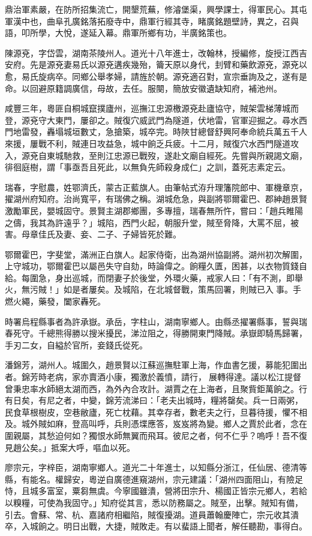 \begin{pinyinscope}
鼎治軍素嚴，在防所招集流亡，開墾荒蕪，修濬堡渠，興學課士，得軍民心。其屯軍漢中也，曲阜孔廣銘落拓廢寺中，鼎軍行經其寺，睹廣銘題壁詩，異之，召與語，叩所學，大悅，遂延入幕。鼎軍所鄉有功，半廣銘策也。

陳源兗，字岱雲，湖南茶陵州人。道光十八年進士，改翰林，授編修，旋授江西吉安府。先是源兗妻易氏以源兗遘疾幾殆，籥天原以身代，刲臂和藥飲源兗，源兗以愈，易氏旋病卒。同鄉公舉孝婦，請旌於朝。源兗適召對，宣宗垂詢及之，遂有是命。以回避原籍調廣信，母故，去任。服闋，簡放安徽遺缺知府，補池州。

咸豐三年，粵匪自桐城竄撲廬州，巡撫江忠源檄源兗赴廬協守，賊架雲梯薄城而登，源兗守大東門，屢卻之。賊復穴威武門為隧道，伏地雷，官軍迎掘之。尋水西門地雷發，轟塌城垣數丈，急搶築，城卒完。時陜甘總督舒興阿奉命統兵萬五千人來援，屢戰不利，賊連日攻益急，城中餉乏兵疲。十二月，賊復穴水西門隧道攻入，源兗自東城馳救，至則江忠源已戰歿，遂赴文廟自經死。先嘗與所親謁文廟，徘徊庭樹，謂「事亟吾且死此，以無負先師殺身成仁」之訓，蓋死志素定云。

瑞春，字慰農，姓鄂濟氏，蒙古正藍旗人。由筆帖式洊升理籓院郎中、軍機章京，擢湖州府知府。治尚寬平，有瑞佛之稱。湖城危急，與副將鄂爾霍巴、郡紳趙景賢激勵軍民，嬰城固守。景賢主湖郡鄉團，多專擅，瑞春無所忤，嘗曰：「趙兵睢陽之儔，我其為許遠乎？」城陷，西門火起，朝服升堂，賊至脅降，大罵不屈，被害。母章佳氏及妻、妾、二子、子婦皆死於難。

鄂爾霍巴，字斐堂，滿洲正白旗人。起家侍衛，出為湖州協副將。湖州初次解圍，上守城功，鄂爾霍巴以屬邑失守自劾，時論偉之。餉糧久匱，困甚，以衣物質錢自給。每圍急，身出巡城，而閉妻子於後堂，外環火藥，戒家人曰：「有不測，即舉火，無污賊！」如是者屢矣。及城陷，在北城督戰，策馬回署，則賊已入事。手燃火繩，藥發，闔家轟死。

時署烏程縣事者為許承嶽。承岳，字柱山，湖南寧鄉人。由縣丞擢署縣事，誓與瑞春死守。千總熊得勝以搜米擾民，涕泣阻之，得勝開東門降賊。承嶽即騎馬歸署，手刃二女，自縊於官所，妾錢氏從死。

潘錦芳，湖州人。城圍久，趙景賢以江蘇巡撫駐軍上海，作血書乞援，募能犯圍出者。錦芳時老病，家亦賣酒小康，獨激於義憤，請行，展轉得達。議以松江提督曾秉忠率水師絕太湖而西，為外內合攻計。湖賈之在上海者，且聚貲鉅萬餉之。行有日矣，有尼之者，中變，錦芳流涕曰：「老夫出城時，糧將罄矣。兵一日兩粥，民食草根樹皮，空巷敝廬，死亡枕藉。其幸存者，數老夫之行，旦暮待援，懼不相及。城外賊如麻，登高叫呼，兵則憑堞應答，岌岌將為變。鄉人之賈於此者，念在圍親屬，其愁迫何如？獨恨水師無翼而飛耳。彼尼之者，何不仁乎？嗚呼！吾不復見趙公矣。」抵案大呼，嘔血以死。

廖宗元，字梓臣，湖南寧鄉人。道光二十年進士，以知縣分浙江，任仙居、德清等縣，有能名。權歸安，粵逆自廣德進窺湖州，宗元建議：「湖州四面阻山，有險足恃，且城多富室，粟芻無虞。今寧國雖潰，營將田宗升、楊國正皆宗元鄉人，若給以糗糧，可使為我固守。」知府從其言，悉以防務屬之。賊至，出擊。賊知有備，引去。會蘇、常、杭、嘉諸府相繼陷，賊復擾湖。道員蕭翰慶陣亡，宗元收其潰卒，入城餉之。明日出戰，大捷，賊敗走。有以蜚語上聞者，解任聽勘，事得白。


\end{pinyinscope}
